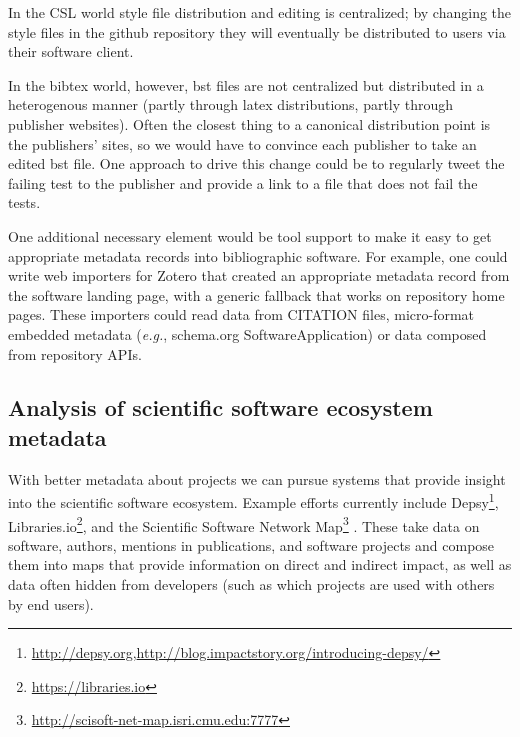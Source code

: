 \documentclass[a4paper,UKenglish]{dagman}
\newcommand{\eg}{\emph{e.g.},\xspace}
\begin{document}
In the CSL world style file distribution and editing is centralized; by changing the style files in the github repository they will eventually be distributed to users via their software client.

In the bibtex world, however, bst files are not centralized but distributed in a heterogenous manner (partly through latex distributions, partly through publisher websites). Often the closest thing to a canonical distribution point is the publishers' sites, so we would have to convince each publisher to take an edited bst file.  One approach to drive this change could be to regularly tweet the failing test to the publisher and provide a link to a file that does not fail the tests.

One additional necessary element would be tool support to make it easy to get appropriate metadata records into bibliographic software. For example, one could write web importers for Zotero that created an appropriate metadata record from the software landing page, with a generic fallback that works on repository home pages. These importers could read data from CITATION files, micro-format embedded metadata (\eg schema.org SoftwareApplication) or data composed from repository APIs.


\subsection{Analysis of scientific software ecosystem metadata}

With better metadata about projects we can pursue systems that provide insight into the scientific software ecosystem.
Example efforts currently include Depsy\footnote{\url{http://depsy.org},\url{http://blog.impactstory.org/introducing-depsy/}},
Libraries.io\footnote{\url{https://libraries.io}},
and the Scientific Software Network Map\footnote{%
\url{http://scisoft-net-map.isri.cmu.edu:7777}}
\cite{mcconahy2012techniques,howison2015understanding}.
These take data on software, authors, mentions in publications, and software projects and compose them into maps that provide information on direct and indirect impact, as well as data often hidden from developers (such as which projects are used with others by end users).
\end{document}
